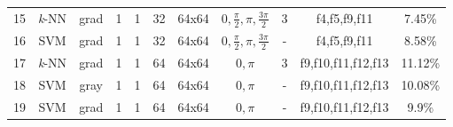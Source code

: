 \documentclass[times, utf8, zavrsni]{fer}
\begin{document}
\begin{adjustwidth}{-30pt}{0pt}
\begin{tabular}{c|c|c|c|c|c|c|c|c|c|c}
15 & \textit{k}-NN & grad & 1 & 1 & 32 & 64x64 & \(0, \frac{\pi}{2}, \pi, \frac{3\pi}{2}\)& 3 & f4,f5,f9,f11 & 7.45\% \\
16 & SVM & grad & 1 & 1 & 32 & 64x64 & \(0, \frac{\pi}{2}, \pi, \frac{3\pi}{2}\)& - & f4,f5,f9,f11 & 8.58\% \\
17 & \textit{k}-NN & grad & 1 & 1 & 64 & 64x64 & \(0, \pi\)& 3 & f9,f10,f11,f12,f13 & 11.12\% \\
18 & SVM & gray & 1 & 1 & 64 & 64x64 & \(0, \pi\)& - & f9,f10,f11,f12,f13 & 10.08\% \\
19 & SVM & grad & 1 & 1 & 64 & 64x64 & \(0, \pi\)& - & f9,f10,f11,f12,f13 & 9.9\% \\

\end{tabular}
\end{adjustwidth}

\newpage
\end{document}
